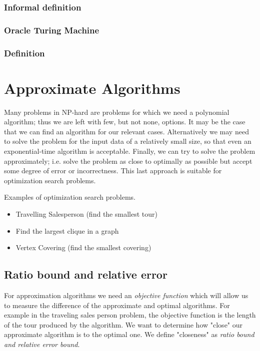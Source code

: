 \documentclass{article}
\theoremstyle{definition}
\begin{document}
\subsubsection{Informal definition}
\subsubsection{Oracle Turing Machine}
\subsubsection{Definition}

\pagebreak
\section{Approximate Algorithms}
Many problems in NP-hard are problems for which we need a polynomial algorithm;
thus we are left with few, but not none, options.
It may be the case that we can find an algorithm for our relevant cases.
Alternatively we may need to solve the problem for the input
data of a relatively small size, so that even an exponential-time algorithm is acceptable.
Finally, we can try to solve the problem approximately;
i.e. solve the problem as close to optimally as possible but accept some degree of error
or incorrectness.
This last approach is suitable for optimization search problems.

Examples of optimization search problems.
\begin{itemize}
    \item Travelling Salesperson (find the smallest tour)
    \item Find the largest clique in a graph
    \item Vertex Covering (find the smallest covering)
\end{itemize}

\subsection{Ratio bound and relative error}
For approximation algorithms we need an \textit{objective function}
which will allow us to measure the difference of the approximate and optimal algorithms.
For example in the traveling sales person problem,
the objective function is the length of the tour produced by the algorithm.
We want to determine how "close" our approximate algorithm is to the
optimal one.  We define "closeness" as \textit{ratio bound and relative error bound}.
\end{document}
